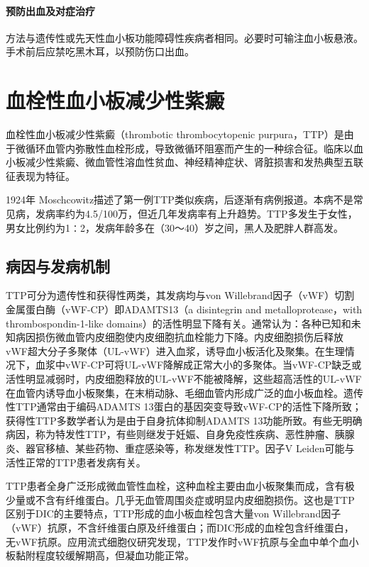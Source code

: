 \paragraph{预防出血及对症治疗}

方法与遗传性或先天性血小板功能障碍性疾病者相同。必要时可输注血小板悬液。手术前后应禁吃黑木耳，以预防伤口出血。

\protect\hypertarget{text00334.html}{}{}

\section{血栓性血小板减少性紫癜}

血栓性血小板减少性紫癜（thrombotic thrombocytopenic
purpura，TTP）是由于微循环血管内弥散性血栓形成，导致微循环阻塞而产生的一种综合征。临床以血小板减少性紫癜、微血管性溶血性贫血、神经精神症状、肾脏损害和发热典型五联征表现为特征。

1924年
Moschcowitz描述了第一例TTP类似疾病，后逐渐有病例报道。本病不是常见病，发病率约为4.5/100万，但近几年发病率有上升趋势。TTP多发生于女性，男女比例约为1∶2，发病年龄多在（30～40）岁之间，黑人及肥胖人群高发。

\subsection{病因与发病机制}

TTP可分为遗传性和获得性两类，其发病均与von
Willebrand因子（vWF）切割金属蛋白酶（vWF-CP）即ADAMTS13（a disintegrin
and metalloprotease，with thrombospondin-1-like
domains）的活性明显下降有关。通常认为：各种已知和未知病因损伤微血管内皮细胞使内皮细胞抗血栓能力下降。内皮细胞损伤后释放vWF超大分子多聚体（UL-vWF）进入血浆，诱导血小板活化及聚集。在生理情况下，血浆中vWF-CP可将UL-vWF降解成正常大小的多聚体。当vWF-CP缺乏或活性明显减弱时，内皮细胞释放的UL-vWF不能被降解，这些超高活性的UL-vWF在血管内诱导血小板聚集，在末梢动脉、毛细血管内形成广泛的血小板血栓。遗传性TTP通常由于编码ADAMTS
13蛋白的基因突变导致vWF-CP的活性下降所致；获得性TTP多数学者认为是由于自身抗体抑制ADAMTS
13功能所致。有些无明确病因，称为特发性TTP，有些则继发于妊娠、自身免疫性疾病、恶性肿瘤、胰腺炎、器官移植、某些药物、重症感染等，称发继发性TTP。因子V
Leiden可能与活性正常的TTP患者发病有关。

TTP患者全身广泛形成微血管性血栓，这种血栓主要由血小板聚集而成，含有极少量或不含有纤维蛋白。几乎无血管周围炎症或明显内皮细胞损伤。这也是TTP区别于DIC的主要特点，TTP形成的血小板血栓包含大量von
Willebrand因子（vWF）抗原，不含纤维蛋白原及纤维蛋白；而DIC形成的血栓包含纤维蛋白，无vWF抗原。应用流式细胞仪研究发现，TTP发作时vWF抗原与全血中单个血小板黏附程度较缓解期高，但凝血功能正常。

